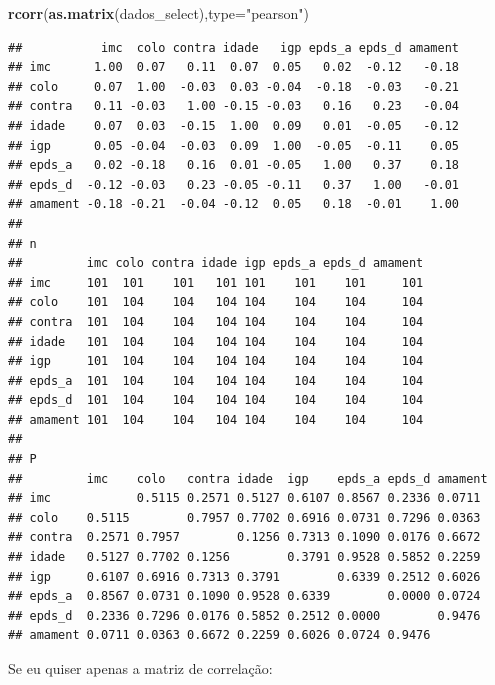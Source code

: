 \documentclass[
]{book}
\newenvironment{Shaded}{\begin{snugshade}}{\end{snugshade}}
\newcommand{\DataTypeTok}[1]{\textcolor[rgb]{0.13,0.29,0.53}{#1}}
\newcommand{\KeywordTok}[1]{\textcolor[rgb]{0.13,0.29,0.53}{\textbf{#1}}}
\newcommand{\NormalTok}[1]{#1}
\newcommand{\OperatorTok}[1]{\textcolor[rgb]{0.81,0.36,0.00}{\textbf{#1}}}
\newcommand{\StringTok}[1]{\textcolor[rgb]{0.31,0.60,0.02}{#1}}
\begin{document}
\begin{Shaded}
\begin{Highlighting}[]
\KeywordTok{rcorr}\NormalTok{(}\KeywordTok{as.matrix}\NormalTok{(dados_select),}\DataTypeTok{type=}\StringTok{"pearson"}\NormalTok{)}
\end{Highlighting}
\end{Shaded}

\begin{verbatim}
##           imc  colo contra idade   igp epds_a epds_d amament
## imc      1.00  0.07   0.11  0.07  0.05   0.02  -0.12   -0.18
## colo     0.07  1.00  -0.03  0.03 -0.04  -0.18  -0.03   -0.21
## contra   0.11 -0.03   1.00 -0.15 -0.03   0.16   0.23   -0.04
## idade    0.07  0.03  -0.15  1.00  0.09   0.01  -0.05   -0.12
## igp      0.05 -0.04  -0.03  0.09  1.00  -0.05  -0.11    0.05
## epds_a   0.02 -0.18   0.16  0.01 -0.05   1.00   0.37    0.18
## epds_d  -0.12 -0.03   0.23 -0.05 -0.11   0.37   1.00   -0.01
## amament -0.18 -0.21  -0.04 -0.12  0.05   0.18  -0.01    1.00
## 
## n
##         imc colo contra idade igp epds_a epds_d amament
## imc     101  101    101   101 101    101    101     101
## colo    101  104    104   104 104    104    104     104
## contra  101  104    104   104 104    104    104     104
## idade   101  104    104   104 104    104    104     104
## igp     101  104    104   104 104    104    104     104
## epds_a  101  104    104   104 104    104    104     104
## epds_d  101  104    104   104 104    104    104     104
## amament 101  104    104   104 104    104    104     104
## 
## P
##         imc    colo   contra idade  igp    epds_a epds_d amament
## imc            0.5115 0.2571 0.5127 0.6107 0.8567 0.2336 0.0711 
## colo    0.5115        0.7957 0.7702 0.6916 0.0731 0.7296 0.0363 
## contra  0.2571 0.7957        0.1256 0.7313 0.1090 0.0176 0.6672 
## idade   0.5127 0.7702 0.1256        0.3791 0.9528 0.5852 0.2259 
## igp     0.6107 0.6916 0.7313 0.3791        0.6339 0.2512 0.6026 
## epds_a  0.8567 0.0731 0.1090 0.9528 0.6339        0.0000 0.0724 
## epds_d  0.2336 0.7296 0.0176 0.5852 0.2512 0.0000        0.9476 
## amament 0.0711 0.0363 0.6672 0.2259 0.6026 0.0724 0.9476
\end{verbatim}

Se eu quiser apenas a matriz de correlação:

\begin{Shaded}
\end{Shaded}
\end{document}

